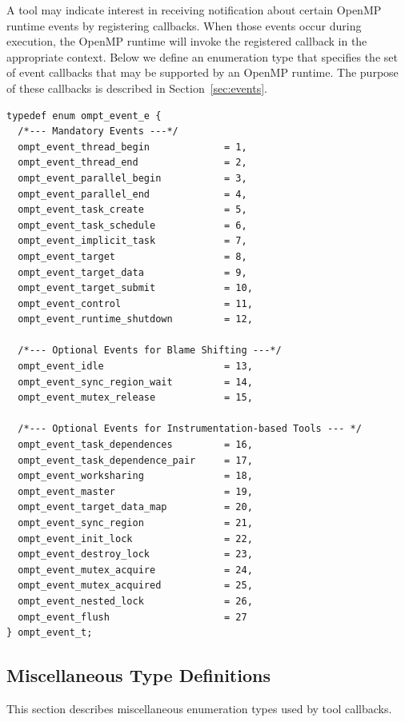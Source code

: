 \documentclass{article}
\begin{document}
A tool may indicate interest in receiving notification about certain OpenMP runtime events by registering callbacks. 
When those events occur during execution, the OpenMP runtime will invoke the registered callback in the appropriate context.
Below we define an enumeration type that specifies the set of event callbacks that may be supported by an OpenMP runtime. 
The purpose of these callbacks is described in Section~\ref{sec:events}. 

\begin{verbatim}
typedef enum ompt_event_e {  
  /*--- Mandatory Events ---*/
  ompt_event_thread_begin             = 1,
  ompt_event_thread_end               = 2,
  ompt_event_parallel_begin           = 3,
  ompt_event_parallel_end             = 4,
  ompt_event_task_create              = 5,
  ompt_event_task_schedule            = 6,
  ompt_event_implicit_task            = 7,
  ompt_event_target                   = 8,
  ompt_event_target_data              = 9,
  ompt_event_target_submit            = 10,
  ompt_event_control                  = 11,
  ompt_event_runtime_shutdown         = 12,

  /*--- Optional Events for Blame Shifting ---*/
  ompt_event_idle                     = 13,
  ompt_event_sync_region_wait         = 14,
  ompt_event_mutex_release            = 15,

  /*--- Optional Events for Instrumentation-based Tools --- */
  ompt_event_task_dependences         = 16,
  ompt_event_task_dependence_pair     = 17,
  ompt_event_worksharing              = 18,
  ompt_event_master                   = 19,
  ompt_event_target_data_map          = 20,
  ompt_event_sync_region              = 21,
  ompt_event_init_lock                = 22,
  ompt_event_destroy_lock             = 23,
  ompt_event_mutex_acquire            = 24,
  ompt_event_mutex_acquired           = 25,
  ompt_event_nested_lock              = 26,
  ompt_event_flush                    = 27
} ompt_event_t;
\end{verbatim}

\clearpage  
\subsection{Miscellaneous Type Definitions}
\label{appendix:ompt-types:misc}
This section describes miscellaneous enumeration types used by tool callbacks.
\end{document}
